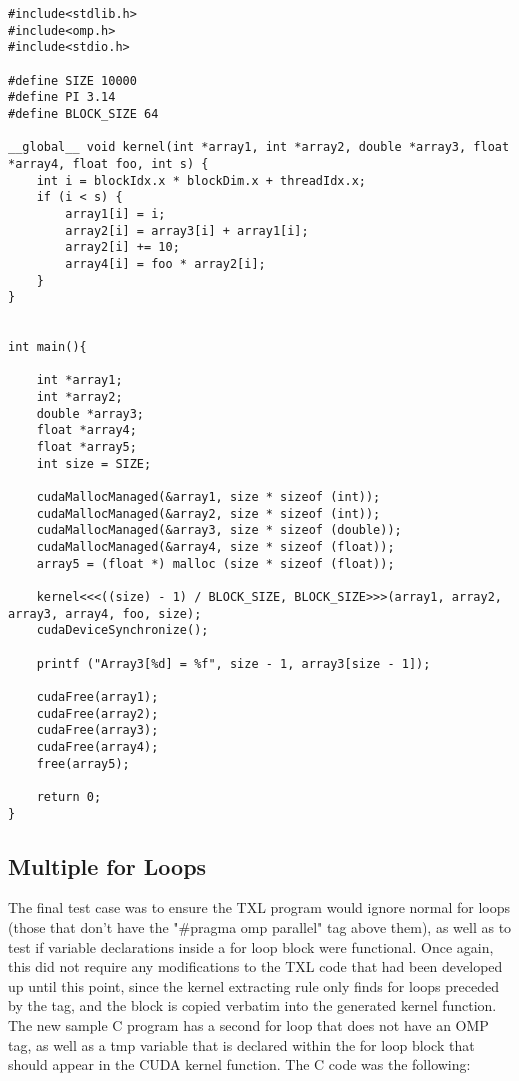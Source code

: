 \documentclass{article}
\begin{document}
\begin{lstlisting}
#include<stdlib.h>
#include<omp.h>
#include<stdio.h>

#define SIZE 10000
#define PI 3.14
#define BLOCK_SIZE 64

__global__ void kernel(int *array1, int *array2, double *array3, float *array4, float foo, int s) {
    int i = blockIdx.x * blockDim.x + threadIdx.x;
    if (i < s) {
        array1[i] = i;
        array2[i] = array3[i] + array1[i];
        array2[i] += 10;
		array4[i] = foo * array2[i];
    }
}


int main(){

	int *array1;
    int *array2;
    double *array3;
    float *array4;
    float *array5;
    int size = SIZE;
	
    cudaMallocManaged(&array1, size * sizeof (int));
    cudaMallocManaged(&array2, size * sizeof (int));
    cudaMallocManaged(&array3, size * sizeof (double));
    cudaMallocManaged(&array4, size * sizeof (float));
    array5 = (float *) malloc (size * sizeof (float));
	
    kernel<<<((size) - 1) / BLOCK_SIZE, BLOCK_SIZE>>>(array1, array2, array3, array4, foo, size);
    cudaDeviceSynchronize();
	
    printf ("Array3[%d] = %f", size - 1, array3[size - 1]);
    
	cudaFree(array1);
    cudaFree(array2);
    cudaFree(array3);
    cudaFree(array4);
    free(array5);
    
	return 0;
}
\end{lstlisting}

\subsection{Multiple for Loops}
The final test case was to ensure the TXL program would ignore normal for loops (those that don't have the "\#pragma omp parallel" tag above them), as well as to test if variable declarations inside a for loop block were functional. Once again, this did not require any modifications to the TXL code that had been developed up until this point, since the kernel extracting rule only finds for loops preceded by the tag, and the block is copied verbatim into the generated kernel function. The new sample C program has a second for loop that does not have an OMP tag, as well as a tmp variable that is declared within the for loop block that should appear in the CUDA kernel function. The C code was the following:
\end{document}
